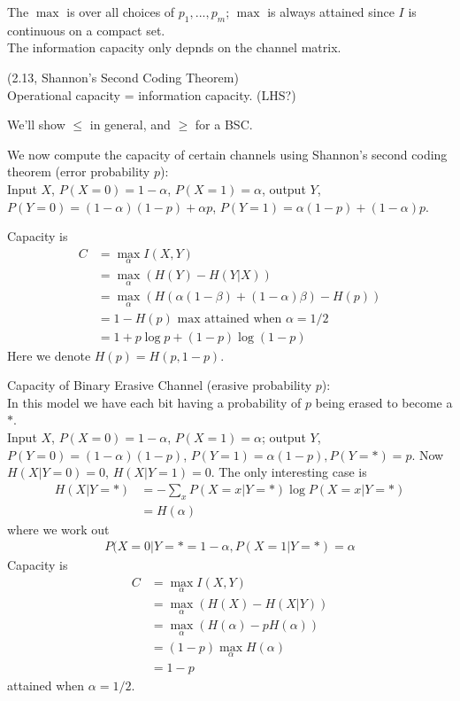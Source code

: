 \documentclass[a4paper]{article}
\begin{document}
\begin{rem}
The $\max$ is over all choices of $p_1,...,p_m$; $\max$ is always attained since $I$ is continuous on a compact set.\\
The information capacity only depnds on the channel matrix.
\end{rem}

\begin{thm} (2.13, Shannon's Second Coding Theorem)\\
Operational capacity = information capacity. (LHS?)

We'll show $\leq$ in general, and $\geq$ for a BSC.
\end{thm}

We now compute the capacity of certain channels using Shannon's second coding theorem (error probability $p$):\\
Input $X$, $P(X=0) = 1-\alpha$, $P(X=1) = \alpha$, output $Y$, $P(Y=0) = (1-\alpha)(1-p) +\alpha p$, $P(Y=1) = \alpha(1-p) + (1-\alpha)p$.

Capacity is 
\begin{equation*}
\begin{aligned}
C &= \max_\alpha I(X,Y)\\
&= \max_\alpha(H(Y) - H(Y|X))\\
&= \max_\alpha(H(\alpha(1-\beta)+(1-\alpha)\beta) - H(p))\\
&= 1-H(p) \text{ max attained when } \alpha=1/2\\
&= 1+p\log p + (1-p) \log (1-p)
\end{aligned}
\end{equation*}
Here we denote $H(p) = H(p,1-p)$.

Capacity of Binary Erasive Channel (erasive probability $p$):\\
In this model we have each bit having a probability of $p$ being erased to become a $*$.\\
Input $X$, $P(X=0) = 1-\alpha$, $P(X=1) = \alpha$; output $Y$, $P(Y=0) = (1-\alpha)(1-p)$, $P(Y=1) = \alpha(1-p), P(Y=*) = p$. Now $H(X|Y=0) = 0$, $H(X|Y=1) = 0$. The only interesting case is 
\begin{equation*}
\begin{aligned}
H(X|Y=*) &= -\sum_x P(X=x|Y=*) \log P(X=x|Y=*)\\
&= H(\alpha)
\end{aligned}
\end{equation*}
where we work out
\begin{equation*}
\begin{aligned}
P(X=0|Y=* = 1-\alpha, P(X=1|Y=*) = \alpha
\end{aligned}
\end{equation*}
Capacity is 
\begin{equation*}
\begin{aligned}
C&=\max_\alpha I(X,Y)\\
&=\max_\alpha (H(X)-H(X|Y))\\
&= \max_\alpha (H(\alpha) - pH(\alpha))\\
&= (1-p) \max_\alpha H(\alpha)\\
&= 1-p
\end{aligned}
\end{equation*}
attained when $\alpha = 1/2$.
\end{document}
